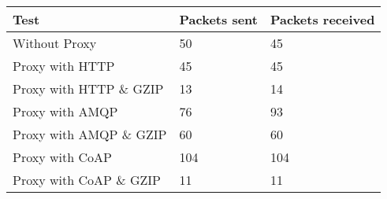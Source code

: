 \begin{tabular}{|l|l|l|}
\hline
\textbf{Test} & \textbf{Packets sent} & \textbf{Packets received} \\ \hline
Without Proxy                    &50         & 45        \\ \hline 
Proxy with HTTP                  &45         & 45        \\ \hline 
Proxy with HTTP \& GZIP          &13         & 14        \\ \hline 
Proxy with AMQP                  &76         & 93        \\ \hline 
Proxy with AMQP \& GZIP          &60         & 60        \\ \hline 
Proxy with CoAP                  &104        & 104       \\ \hline 
Proxy with CoAP \& GZIP          &11         & 11        \\ \hline 
\end{tabular}